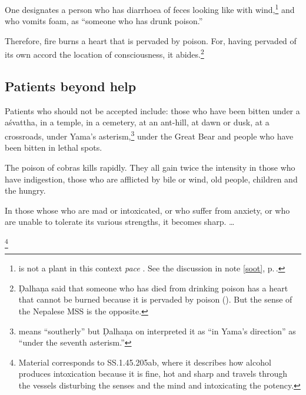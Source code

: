 \begin{translation}[resume]
One designates a person who has diarrhoea of feces looking like
 with wind,\footnote{is not a plant
    in this context \emph{pace} \cite[362]{moni-sans}. See the discussion
    in note \ref{soot}, p.\,\pageref{soot}.\label{grhadhuma}} and who
    vomits foam, as “someone who has drunk poison.” \item[37]  Therefore,
    fire burns a  heart that is  pervaded by poison. For, having pervaded
    of its own accord  the location of consciousness, it
    abides.\footnote{Ḍalhaṇa said that someone who has died from drinking
        poison has a heart that cannot be burned because it is pervaded by
        poison (). But the sense of the Nepalese MSS is the
        opposite.}
 
 \subsection{Patients beyond help}  
 
 \item[38] 

Patients who should not be accepted include: those who have been
bitten under a \gls{aśvattha}, in a temple, in a cemetery, at an
ant-hill, at dawn or dusk, at a crossroads, under Yama's
asterism,\footnote{ means “southerly” but Ḍalhaṇa on
     interpreted it as “in
    Yama's direction” as “under the seventh asterism.”} under the Great
    Bear and people who have been bitten in lethal spots.
 
 \item[39]  
 
The poison of cobras kills rapidly.  They all gain twice the intensity
in those who have indigestion, those who are afflicted by bile or
wind, old people, children and the hungry.
 
 
 \item[39.1]  
 
In those whose who are mad or intoxicated, or who suffer from anxiety,
or who are unable to tolerate its various strengths, it becomes sharp.
\dag \ldots
 
 \item[39.2] 
 
 
 
 \footnote{Material corresponds to SS.1.45.205ab, where it  
 describes how alcohol produces intoxication because it is fine, hot  
 and sharp and travels through the vessels disturbing the senses and  
 the mind and intoxicating the potency.}  
 

\end{translation}
